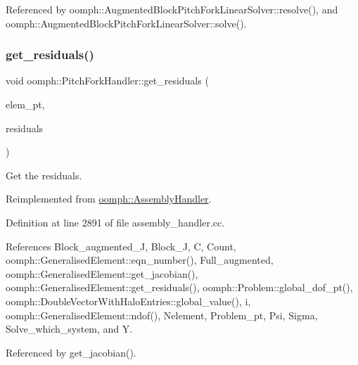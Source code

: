 Referenced by oomph\+::\+Augmented\+Block\+Pitch\+Fork\+Linear\+Solver\+::resolve(), and oomph\+::\+Augmented\+Block\+Pitch\+Fork\+Linear\+Solver\+::solve().

\mbox{\label{classoomph_1_1PitchForkHandler_a461b24284da88b9489d720e484a6925c}} 
\subsubsection{\texorpdfstring{get\+\_\+residuals()}{get\_residuals()}}
{\footnotesize\ttfamily void oomph\+::\+Pitch\+Fork\+Handler\+::get\+\_\+residuals (\begin{DoxyParamCaption}\item[{\hyperlink{classoomph_1_1GeneralisedElement}{Generalised\+Element} $\ast$const \&}]{elem\+\_\+pt,  }\item[{\hyperlink{classoomph_1_1Vector}{Vector}$<$ double $>$ \&}]{residuals }\end{DoxyParamCaption})\hspace{0.3cm}{\ttfamily [virtual]}}



Get the residuals. 



Reimplemented from \hyperlink{classoomph_1_1AssemblyHandler_a7a6203b0ab90da62b4da2af8a26d08b3}{oomph\+::\+Assembly\+Handler}.



Definition at line 2891 of file assembly\+\_\+handler.\+cc.



References Block\+\_\+augmented\+\_\+J, Block\+\_\+J, C, Count, oomph\+::\+Generalised\+Element\+::eqn\+\_\+number(), Full\+\_\+augmented, oomph\+::\+Generalised\+Element\+::get\+\_\+jacobian(), oomph\+::\+Generalised\+Element\+::get\+\_\+residuals(), oomph\+::\+Problem\+::global\+\_\+dof\+\_\+pt(), oomph\+::\+Double\+Vector\+With\+Halo\+Entries\+::global\+\_\+value(), i, oomph\+::\+Generalised\+Element\+::ndof(), Nelement, Problem\+\_\+pt, Psi, Sigma, Solve\+\_\+which\+\_\+system, and Y.



Referenced by get\+\_\+jacobian().

\mbox{\label{classoomph_1_1PitchForkHandler_ac1a4bbb1415a009e9f176f16263fcb3e}} 
